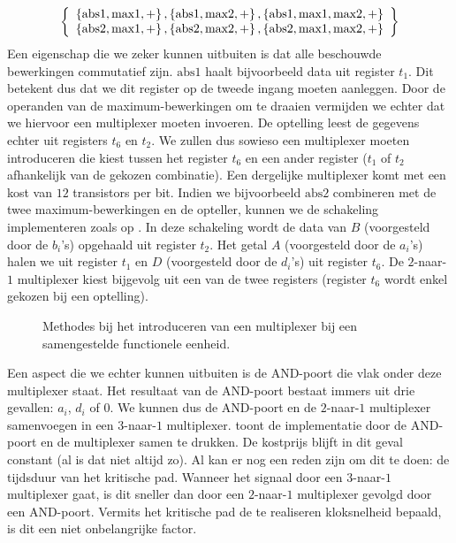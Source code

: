 \begin{equation}
\left\{ \begin{array}{c} \left\{ \mbox{abs1},\mbox{max1},+ \right\},\left\{ \mbox{abs1},\mbox{max2},+ \right\},\left\{ \mbox{abs1},\mbox{max1},\mbox{max2},+ \right\}\\\left\{ \mbox{abs2},\mbox{max1},+ \right\},\left\{ \mbox{abs2},\mbox{max2},+ \right\},\left\{ \mbox{abs2},\mbox{max1},\mbox{max2},+ \right\} \end{array} \right\}
\end{equation}
Een eigenschap die we zeker kunnen uitbuiten is dat alle beschouwde bewerkingen commutatief zijn. $\mbox{abs1}$ haalt bijvoorbeeld data uit register $t_1$. Dit betekent dus dat we dit register op de tweede ingang moeten aanleggen. Door de operanden van de maximum-bewerkingen om te draaien vermijden we echter dat we hiervoor een multiplexer moeten invoeren. De optelling leest de gegevens echter uit registers $t_6$ en $t_2$. We zullen dus sowieso een multiplexer moeten introduceren die kiest tussen het register $t_6$ en een ander register ($t_1$ of $t_2$ afhankelijk van de gekozen combinatie). Een dergelijke multiplexer komt met een kost van $12$ transistors per bit. Indien we bijvoorbeeld $\mbox{abs2}$ combineren met de twee maximum-bewerkingen en de opteller, kunnen we de schakeling implementeren zoals op . In deze schakeling wordt de data van $B$ (voorgesteld door de $b_i$'s) opgehaald uit register $t_2$. Het getal $A$ (voorgesteld door de $a_i$'s) halen we uit register $t_1$ en $D$ (voorgesteld door de $d_i$'s) uit register $t_6$. De $2$-naar-$1$ multiplexer kiest bijgevolg uit een van de twee registers (register $t_6$ wordt enkel gekozen bij een optelling).
\begin{figure}[hbt]
\centering
{}
\caption{Methodes bij het introduceren van een multiplexer bij een samengestelde functionele eenheid.}
\end{figure}
Een aspect die we echter kunnen uitbuiten is de AND-poort die vlak onder deze multiplexer staat. Het resultaat van de AND-poort bestaat immers uit drie gevallen: $a_i$, $d_i$ of $0$. We kunnen dus de AND-poort en de $2$-naar-$1$ multiplexer samenvoegen in een $3$-naar-$1$ multiplexer.  toont de implementatie door de AND-poort en de multiplexer samen te drukken. De kostprijs blijft in dit geval constant (al is dat niet altijd zo). Al kan er nog een reden zijn om dit te doen: de tijdsduur van het kritische pad. Wanneer het signaal door een $3$-naar-$1$ multiplexer gaat, is dit sneller dan door een $2$-naar-$1$ multiplexer gevolgd door een AND-poort. Vermits het kritische pad de te realiseren kloksnelheid bepaald, is dit een niet onbelangrijke factor.
